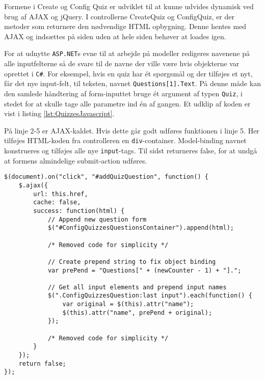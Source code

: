 Formene i Create og Config Quiz er udviklet til at kunne udvides dynamisk ved brug af AJAX og jQuery. I controllerne CreateQuiz og ConfigQuiz, er der metoder som returnere den nødvendige HTML opbygning. Denne hentes med AJAX og indsættes på siden uden at hele siden behøver at loades igen.

For at udnytte \verb+ASP.NET+s evne til at arbejde på modeller redigeres navenene på alle inputfelterne så de svare til de navne der ville være hvis objekterne var oprettet i \verb+C#+.
For eksempel, hvis en quiz har ét spørgsmål og der tilføjes et nyt, får det nye input-felt, til teksten, navnet \verb+Questions[1].Text+.
På denne måde kan den samlede håndtering af form-inputtet bruge ét argument af typen \verb+Quiz+, i stedet for at skulle tage alle parametre ind én af gangen. Et udklip af koden er vist i listing \ref{lst:QuizzesJavascript}.

På linje 2-5 er AJAX-kaldet. Hvis dette går godt udføres funktionen i linje 5. Her tilføjes HTML-koden fra controlleren en \verb+div+-container. Model-binding navnet konstrueres og tilføjes alle nye \verb+input+-tags. Til sidst returneres false, for at undgå at formens almindelige submit-action udføres.

\begin{lstlisting}[caption=JavaScript udklip til AJAX og model-binding håndtering ved indsættelse af nye spørgsmål, label=lst:QuizzesJavascript]
$(document).on("click", "#addQuizQuestion", function() {
    $.ajax({
        url: this.href,
        cache: false,
        success: function(html) {
            // Append new question form
            $("#ConfigQuizzesQuestionsContainer").append(html);

            /* Removed code for simplicity */
			
            // Create prepend string to fix object binding
            var prePend = "Questions[" + (newCounter - 1) + "].";

            // Get all input elements and prepend input names
            $(".ConfigQuizzesQuestion:last input").each(function() {
                var original = $(this).attr("name");
                $(this).attr("name", prePend + original);
            });
            
            /* Removed code for simplicity */
        }
    });
    return false;
});
\end{lstlisting}